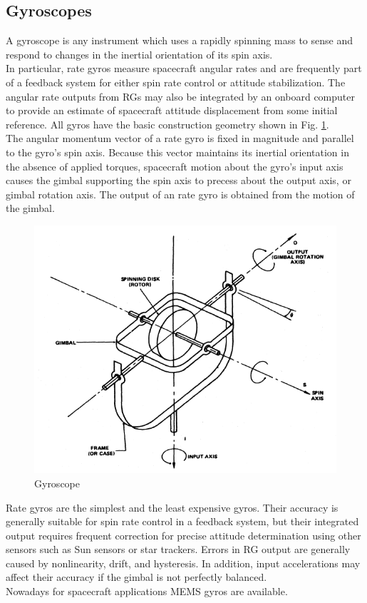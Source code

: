 \documentclass[11pt,a4paper]{report}
\begin{document}
\subsection{Gyroscopes}
A gyroscope is any instrument which uses a rapidly spinning mass to sense and respond to changes in the inertial orientation of its spin axis.\\
In particular, rate gyros measure spacecraft angular rates and are frequently part of a feedback system for either spin rate control or attitude stabilization. The angular rate outputs from RGs may also be integrated by an onboard computer to provide an estimate of spacecraft attitude displacement from some initial reference. 
All gyros have the basic construction geometry shown in Fig. \ref{fig:gyro}.\\
The angular momentum vector of a rate gyro is fixed in magnitude and parallel
to the gyro's spin axis. Because this vector maintains its inertial orientation in the absence of applied torques, spacecraft motion about the gyro's input axis causes the gimbal supporting the spin axis to precess about the output axis, or gimbal rotation axis. The output of an rate gyro is obtained from the motion of the gimbal.\\

\begin{figure}[H]
 	\centering
 	\includegraphics[scale=0.4]{gfx/gyroscope.png}
    \caption{Gyroscope}
    \label{fig:gyro}
\end{figure}

Rate gyros are the simplest and the least expensive gyros. Their accuracy is
generally suitable for spin rate control in a feedback system, but their integrated output requires frequent correction for precise attitude determination using other sensors such as Sun sensors or star trackers.
Errors in RG output are generally caused by nonlinearity, drift, and hysteresis. In addition, input accelerations may affect their accuracy if the gimbal is not perfectly balanced.\\
Nowadays for spacecraft applications MEMS gyros are available.\\
\end{document}
